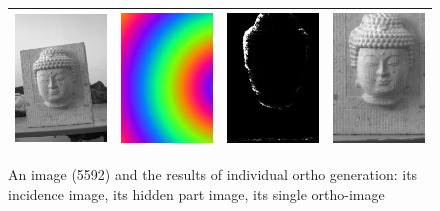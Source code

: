 \begin{figure}
\begin{tabular}{||c|c|c|c||}
   \hline \hline
   \includegraphics[width=40mm]{FIGS/Boudhas/IMG_5592.jpg} &
   \includegraphics[width=40mm]{FIGS/Boudhas/Incid_IMG_5592_8Bits.jpg} &
   \includegraphics[width=40mm]{FIGS/Boudhas/Hidden_5592.jpg}  &
   \includegraphics[width=40mm]{FIGS/Boudhas/Ort_IMG_5592.jpg} \\ \hline  \hline
\end{tabular}
\caption{An image (5592) and the results of individual ortho generation:
its incidence image, its hidden part image, its single ortho-image}
\label{Resul:Ortho:MM}
\end{figure}












